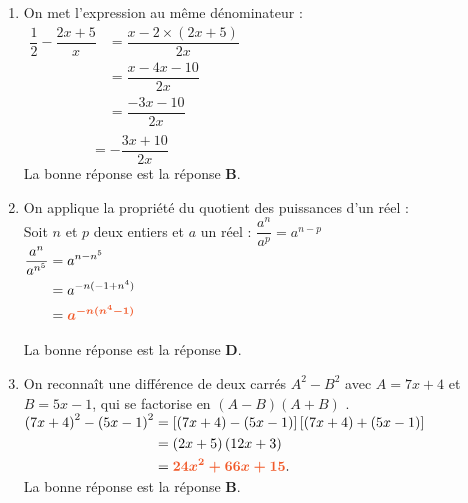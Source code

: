 \documentclass[a4paper,11pt]{article}
\newcounter{seancenum}
\newcounter{seancenumD}
\begin{document}
\setcounter{seancenumD}{27}
\newpage
\begin{seanceD}{} %

\begin{enumerate}
\item On met l'expression au même dénominateur : \\$\begin{aligned}
        \dfrac{1}{2}-\dfrac{2x+5}{x}&=\dfrac{x-2\times \left(2x+5\right)}{2x}\\
        &=\dfrac{x -4x -10}{2x}\\
        &=\dfrac{-3x -10}{2x}\\
     \end{aligned}$\\$\phantom{\dfrac{1}{2}-\dfrac{2x+5}{x}}=-\dfrac{3x +10}{2x}$\\La bonne réponse est la réponse {\bfseries \color[HTML]{F15929}B}.

\item On applique la propriété du quotient des puissances d'un réel : \\
      Soit $n$ et $p$ deux entiers et $a$ un réel :  $\dfrac{a^n}{a^p}=a^{n-p}$\\
      $\begin{aligned} \dfrac{a^{n}}{a^{n^{5}}}&=a^{n-n^{5}}\\
      &=a^{-n(-1+n^{4})}\\
      &={\color[HTML]{F15929}\boldsymbol{a^{-n(n^{4}-1)}}}
      \end{aligned}$

\medskip
La bonne réponse est la réponse {\bfseries \color[HTML]{F15929}D}.

\item On reconnaît une différence de deux carrés $A^2-B^2$ avec $A=7x+4$ et $B=5x-1$, qui se factorise en $(A-B)(A+B)$ .\\
    $\begin{aligned}
    \left(7x+4\right)^2-\left(5x-1\right)^2&=\left[\left(7x+4\right)-\left(5x-1\right)\right]\left[\left(7x+4\right)+\left(5x-1\right)\right]\\
    &=\left(2x+5\right)\left(12x+3\right)\\
    &={\color[HTML]{F15929}\boldsymbol{24x^{2}+66x+15}}.
    \end{aligned}$\\La bonne réponse est la réponse {\bfseries \color[HTML]{F15929}B}.


\end{enumerate}
\end{seanceD}
\end{document}

